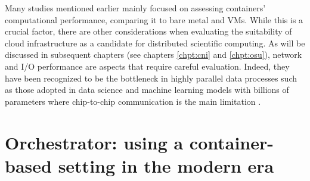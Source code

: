 
Many studies mentioned earlier mainly focused on assessing containers'
computational performance, comparing it to bare metal and VMs. While this is a
crucial factor, there are other considerations when evaluating the suitability
of cloud infrastructure as a candidate for distributed scientific computing. As
will be discussed in subsequent chapters (see chapters \ref{chpt:cni} and
\ref{chpt:osu}), network and I/O performance are aspects that require careful
evaluation. Indeed, they have been recognized to be the bottleneck in highly
parallel data processes such as those adopted in data science and machine
learning models with billions of parameters where chip-to-chip communication is
the main limitation \cite{Pope_2023}.

\section{Orchestrator: using a container-based setting in the modern era}
\label{sec:chpt1-orchestrator}





